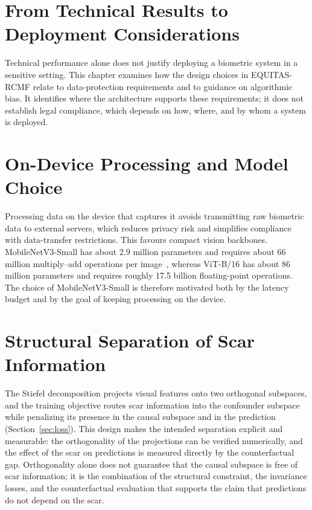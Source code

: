 \section{From Technical Results to Deployment Considerations}
Technical performance alone does not justify deploying a biometric system in a sensitive setting. This chapter examines how the design choices in EQUITAS-RCMF relate to data-protection requirements and to guidance on algorithmic bias. It identifies where the architecture supports these requirements; it does not establish legal compliance, which depends on how, where, and by whom a system is deployed.

\section{On-Device Processing and Model Choice}
Processing data on the device that captures it avoids transmitting raw biometric data to external servers, which reduces privacy risk and simplifies compliance with data-transfer restrictions. This favours compact vision backbones. MobileNetV3-Small has about 2.9 million parameters and requires about 66 million multiply--add operations per image~\cite{howard2019}, whereas ViT-B/16 has about 86 million parameters and requires roughly 17.5 billion floating-point operations.
The choice of MobileNetV3-Small is therefore motivated both by the latency budget and by the goal of keeping processing on the device.

\section{Structural Separation of Scar Information}
The Stiefel decomposition projects visual features onto two orthogonal subspaces, and the training objective routes scar information into the confounder subspace while penalizing its presence in the causal subspace and in the prediction (Section~\ref{sec:loss}). This design makes the intended separation explicit and measurable: the orthogonality of the projections can be verified numerically, and the effect of the scar on predictions is measured directly by the counterfactual gap. Orthogonality alone does not guarantee that the causal subspace is free of scar information; it is the combination of the structural constraint, the invariance losses, and the counterfactual evaluation that supports the claim that predictions do not depend on the scar.

